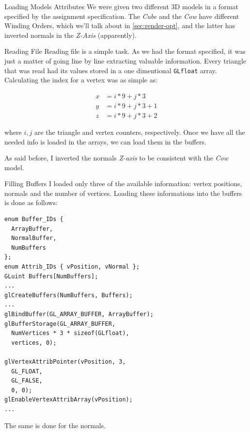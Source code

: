 \documentclass{article}
\begin{document}
\begin{multicols}{2}

\begin{section}{Loading Models Attributes}
  We were given two different 3D models in a format specified by the assignment
specification. The \textit{Cube} and the \textit{Cow} have different Winding
Orders, which we'll talk about in \cref{sec:render-opt}, and the latter has
inverted normals in the \textit{Z-Axis} (apparently).

  \begin{subsection}{Reading File}
    Reading file is a simple task. As we had the format specified, it was just a
matter of going line by line extracting valuable information. Every triangle
that was read had its values stored in a one dimentional \texttt{GLfloat} array.
Calculating the index for a vertex was as simple as:

  \begin{align*}
    x &= i * 9 + j * 3 \\
    y &= i * 9 + j * 3 + 1 \\
    z &= i * 9 + j * 3 + 2
  \end{align*}

  where $i, j$ are the triangle and vertex counters, respectively. Once we have
all the needed info is loaded in the arrays, we can load them in the buffers.

  As said before, I inverted the normals \textit{Z-axis} to be consistent with
the \textit{Cow} model.
  \end{subsection}

  \begin{subsection}{Filling Buffers}
    I loaded only three of the available information: vertex positions,
normals and the number of vertices. Loading these informations into the buffers
is done as follows:

  \begin{verbatim}
enum Buffer_IDs {
  ArrayBuffer,
  NormalBuffer,
  NumBuffers
};
enum Attrib_IDs { vPosition, vNormal };
GLuint Buffers[NumBuffers];
...
glCreateBuffers(NumBuffers, Buffers);
...
glBindBuffer(GL_ARRAY_BUFFER, ArrayBuffer);
glBufferStorage(GL_ARRAY_BUFFER,
  NumVertices * 3 * sizeof(GLfloat),
  vertices, 0);

glVertexAttribPointer(vPosition, 3,
  GL_FLOAT,
  GL_FALSE,
  0, 0);
glEnableVertexAttribArray(vPosition);
...
  \end{verbatim}

  The same is done for the normals.


\end{subsection}
\end{section}
\end{multicols}
\end{document}
